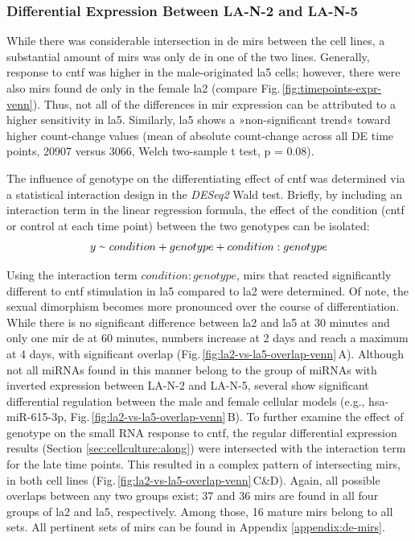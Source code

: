 \subsubsection{Differential Expression Between LA-N-2 and LA-N-5}
While there was considerable intersection in \ac{de} \acp{mir} between the cell lines, a substantial amount of \acp{mir} was only \ac{de} in one of the two lines. Generally, response to \ac{cntf} was higher in the male-originated \ac{la5} cells; however, there were also \acp{mir} found \ac{de} only in the female \ac{la2} (compare Fig.\,\ref{fig:timepoints-expr-venn}). Thus, not all of the differences in \ac{mir} expression can be attributed to a higher sensitivity in \ac{la5}. Similarly, \ac{la5} shows a »non-significant trend« toward higher count-change values (mean of absolute count-change across all DE time points, \num{20907} versus \num{3066}, Welch two-sample t test, p = 0.08).

The influence of genotype on the differentiating effect of \ac{cntf} was determined via a statistical interaction design in the \textit{DESeq2} Wald test. Briefly, by including an interaction term in the linear regression formula, the effect of the condition (\ac{cntf} or control at each time point) between the two genotypes can be isolated: $$y \smallsim condition + genotype + condition:genotype$$

Using the interaction term $condition:genotype$, \acp{mir} that reacted significantly different to \ac{cntf} stimulation in \ac{la5} compared to \ac{la2} were determined. Of note, the sexual dimorphism becomes more pronounced over the course of differentiation. While there is no significant difference between \ac{la2} and \ac{la5} at 30 minutes and only one \ac{mir} \ac{de} at 60 minutes, numbers increase at 2 days and reach a maximum at 4 days, with significant overlap (Fig.\,\ref{fig:la2-vs-la5-overlap-venn}\,A). Although not all miRNAs found in this manner belong to the group of miRNAs with inverted expression between LA-N-2 and LA-N-5, several show significant differential regulation between the male and female cellular models (e.g., hsa-miR-615-3p, Fig.\,\ref{fig:la2-vs-la5-overlap-venn}\,B). To further examine the effect of genotype on the small RNA response to \ac{cntf}, the regular differential expression results (Section \ref{sec:cellculture:along}) were intersected with the interaction term for the late time points. This resulted in a complex pattern of intersecting \acp{mir}, in both cell lines (Fig.\,\ref{fig:la2-vs-la5-overlap-venn}\,C\&D). Again, all possible overlaps between any two groups exist; 37 and 36 \acp{mir} are found in all four groups of \ac{la2} and \ac{la5}, respectively. Among those, 16 mature \acp{mir} belong to all sets. All pertinent sets of \acp{mir} can be found in Appendix \ref{appendix:de-mirs}. 

